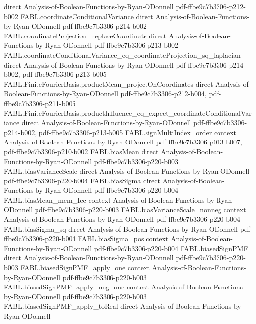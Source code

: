 \begin{theorem}
  {direct}
  {Analysis-of-Boolean-Functions-by-Ryan-ODonnell}
  {pdf-ffbe9c7b3306-p212-b002}
\proofstep
  {FABL.coordinateConditionalVariance}
  {direct}
  {Analysis-of-Boolean-Functions-by-Ryan-ODonnell}
  {pdf-ffbe9c7b3306-p214-b002}
\proofstep
  {FABL.coordinateProjection_replaceCoordinate}
  {direct}
  {Analysis-of-Boolean-Functions-by-Ryan-ODonnell}
  {pdf-ffbe9c7b3306-p213-b002}
\proofstep
  {FABL.coordinateConditionalVariance_eq_coordinateProjection_sq_laplacian}
  {direct}
  {Analysis-of-Boolean-Functions-by-Ryan-ODonnell}
  {pdf-ffbe9c7b3306-p214-b002,
    pdf-ffbe9c7b3306-p213-b005}
\proofstep
  {FABL.FiniteFourierBasis.productMean_projectOnCoordinates}
  {direct}
  {Analysis-of-Boolean-Functions-by-Ryan-ODonnell}
  {pdf-ffbe9c7b3306-p212-b004,
    pdf-ffbe9c7b3306-p211-b005}
\proofstep
  {FABL.FiniteFourierBasis.productInfluence_eq_expect_coordinateConditionalVariance}
  {direct}
  {Analysis-of-Boolean-Functions-by-Ryan-ODonnell}
  {pdf-ffbe9c7b3306-p214-b002,
    pdf-ffbe9c7b3306-p213-b005}
\proofstep
  {FABL.signMultiIndex_order}
  {context}
  {Analysis-of-Boolean-Functions-by-Ryan-ODonnell}
  {pdf-ffbe9c7b3306-p013-b007,
    pdf-ffbe9c7b3306-p210-b002}
\proofstep
  {FABL.biasMean}
  {direct}
  {Analysis-of-Boolean-Functions-by-Ryan-ODonnell}
  {pdf-ffbe9c7b3306-p220-b003}
\proofstep
  {FABL.biasVarianceScale}
  {direct}
  {Analysis-of-Boolean-Functions-by-Ryan-ODonnell}
  {pdf-ffbe9c7b3306-p220-b004}
\proofstep
  {FABL.biasSigma}
  {direct}
  {Analysis-of-Boolean-Functions-by-Ryan-ODonnell}
  {pdf-ffbe9c7b3306-p220-b004}
\proofstep
  {FABL.biasMean_mem_Icc}
  {context}
  {Analysis-of-Boolean-Functions-by-Ryan-ODonnell}
  {pdf-ffbe9c7b3306-p220-b003}
\proofstep
  {FABL.biasVarianceScale_nonneg}
  {context}
  {Analysis-of-Boolean-Functions-by-Ryan-ODonnell}
  {pdf-ffbe9c7b3306-p220-b004}
\proofstep
  {FABL.biasSigma_sq}
  {direct}
  {Analysis-of-Boolean-Functions-by-Ryan-ODonnell}
  {pdf-ffbe9c7b3306-p220-b004}
\proofstep
  {FABL.biasSigma_pos}
  {context}
  {Analysis-of-Boolean-Functions-by-Ryan-ODonnell}
  {pdf-ffbe9c7b3306-p220-b004}
\proofstep
  {FABL.biasedSignPMF}
  {direct}
  {Analysis-of-Boolean-Functions-by-Ryan-ODonnell}
  {pdf-ffbe9c7b3306-p220-b003}
\proofstep
  {FABL.biasedSignPMF_apply_one}
  {context}
  {Analysis-of-Boolean-Functions-by-Ryan-ODonnell}
  {pdf-ffbe9c7b3306-p220-b003}
\proofstep
  {FABL.biasedSignPMF_apply_neg_one}
  {context}
  {Analysis-of-Boolean-Functions-by-Ryan-ODonnell}
  {pdf-ffbe9c7b3306-p220-b003}
\proofstep
  {FABL.biasedSignPMF_apply_toReal}
  {direct}
  {Analysis-of-Boolean-Functions-by-Ryan-ODonnell}

\end{theorem}
